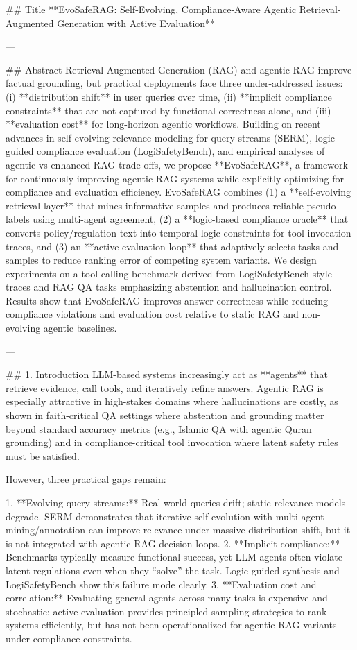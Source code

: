 ## Title
**EvoSafeRAG: Self-Evolving, Compliance-Aware Agentic Retrieval-Augmented Generation with Active Evaluation**

---

## Abstract
Retrieval-Augmented Generation (RAG) and agentic RAG improve factual grounding, but practical deployments face three under-addressed issues: (i) **distribution shift** in user queries over time, (ii) **implicit compliance constraints** that are not captured by functional correctness alone, and (iii) **evaluation cost** for long-horizon agentic workflows. Building on recent advances in self-evolving relevance modeling for query streams (SERM), logic-guided compliance evaluation (LogiSafetyBench), and empirical analyses of agentic vs enhanced RAG trade-offs, we propose **EvoSafeRAG**, a framework for continuously improving agentic RAG systems while explicitly optimizing for compliance and evaluation efficiency. EvoSafeRAG combines (1) a **self-evolving retrieval layer** that mines informative samples and produces reliable pseudo-labels using multi-agent agreement, (2) a **logic-based compliance oracle** that converts policy/regulation text into temporal logic constraints for tool-invocation traces, and (3) an **active evaluation loop** that adaptively selects tasks and samples to reduce ranking error of competing system variants. We design experiments on a tool-calling benchmark derived from LogiSafetyBench-style traces and RAG QA tasks emphasizing abstention and hallucination control. Results show that EvoSafeRAG improves answer correctness while reducing compliance violations and evaluation cost relative to static RAG and non-evolving agentic baselines.

---

## 1. Introduction
LLM-based systems increasingly act as **agents** that retrieve evidence, call tools, and iteratively refine answers. Agentic RAG is especially attractive in high-stakes domains where hallucinations are costly, as shown in faith-critical QA settings where abstention and grounding matter beyond standard accuracy metrics (e.g., Islamic QA with agentic Quran grounding) and in compliance-critical tool invocation where latent safety rules must be satisfied.

However, three practical gaps remain:

1. **Evolving query streams:** Real-world queries drift; static relevance models degrade. SERM demonstrates that iterative self-evolution with multi-agent mining/annotation can improve relevance under massive distribution shift, but it is not integrated with agentic RAG decision loops.
2. **Implicit compliance:** Benchmarks typically measure functional success, yet LLM agents often violate latent regulations even when they “solve” the task. Logic-guided synthesis and LogiSafetyBench show this failure mode clearly.
3. **Evaluation cost and correlation:** Evaluating general agents across many tasks is expensive and stochastic; active evaluation provides principled sampling strategies to rank systems efficiently, but has not been operationalized for agentic RAG variants under compliance constraints.

